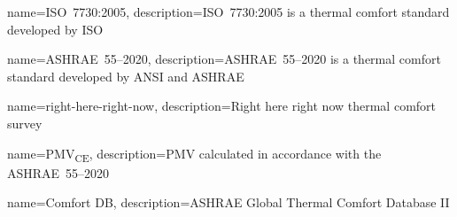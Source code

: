 \usepackage[nonumberlist,nogroupskip]{glossaries}


{
name={ISO~7730:2005},
description={ISO~7730:2005 is a thermal comfort standard developed by ISO}
}

{
name={ASHRAE~55--2020},
description={ASHRAE~55--2020 is a thermal comfort standard developed by ANSI and ASHRAE}
}

{
name={right-here-right-now},
description={Right here right now thermal comfort survey}
}

{
name={PMV\textsubscript{CE}},
description={PMV calculated in accordance with the ASHRAE~55--2020}
}

{
name={Comfort DB},
description={ASHRAE Global Thermal Comfort Database II}
}

\makenoidxglossaries